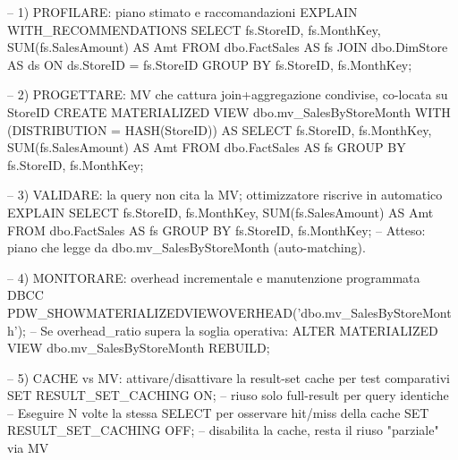 -- 1) PROFILARE: piano stimato e raccomandazioni
EXPLAIN WITH_RECOMMENDATIONS
SELECT
  fs.StoreID, fs.MonthKey,
  SUM(fs.SalesAmount) AS Amt
FROM dbo.FactSales AS fs
JOIN dbo.DimStore AS ds ON ds.StoreID = fs.StoreID
GROUP BY fs.StoreID, fs.MonthKey;

-- 2) PROGETTARE: MV che cattura join+aggregazione condivise, co-locata su StoreID
CREATE MATERIALIZED VIEW dbo.mv_SalesByStoreMonth
WITH (DISTRIBUTION = HASH(StoreID))
AS
SELECT
  fs.StoreID, fs.MonthKey,
  SUM(fs.SalesAmount) AS Amt
FROM dbo.FactSales AS fs
GROUP BY fs.StoreID, fs.MonthKey;

-- 3) VALIDARE: la query non cita la MV; ottimizzatore riscrive in automatico
EXPLAIN
SELECT
  fs.StoreID, fs.MonthKey,
  SUM(fs.SalesAmount) AS Amt
FROM dbo.FactSales AS fs
GROUP BY fs.StoreID, fs.MonthKey;
-- Atteso: piano che legge da dbo.mv_SalesByStoreMonth (auto-matching).

-- 4) MONITORARE: overhead incrementale e manutenzione programmata
DBCC PDW_SHOWMATERIALIZEDVIEWOVERHEAD('dbo.mv_SalesByStoreMonth');
-- Se overhead_ratio supera la soglia operativa:
ALTER MATERIALIZED VIEW dbo.mv_SalesByStoreMonth REBUILD;

-- 5) CACHE vs MV: attivare/disattivare la result-set cache per test comparativi
SET RESULT_SET_CACHING ON;   -- riuso solo full-result per query identiche
-- Eseguire N volte la stessa SELECT per osservare hit/miss della cache
SET RESULT_SET_CACHING OFF;  -- disabilita la cache, resta il riuso "parziale" via MV